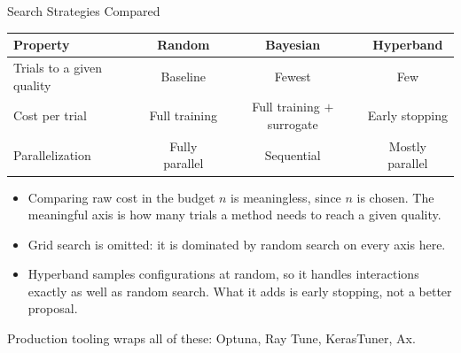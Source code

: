 \documentclass[aspectratio=169,11pt]{beamer}
\newcommand{\emphc}[1]{\textcolor{harvardcrimson}{#1}}
\begin{document}
\begin{frame}{Search Strategies Compared}
\begin{center}
\renewcommand{\arraystretch}{1.3}
\begin{tabular}{@{}lccc@{}}
\toprule
\textbf{Property} & \textbf{Random} & \textbf{Bayesian} & \textbf{Hyperband} \\
\midrule
Trials to a given quality & Baseline & \emphc{Fewest} & Few \\
Cost per trial & Full training & Full training $+$ surrogate & \emphc{Early stopping} \\
Parallelization & Fully parallel & Sequential & Mostly parallel \\
\bottomrule
\end{tabular}
\end{center}

\vspace{0.4cm}
\begin{itemize}\itemsep3pt
    \item Comparing raw cost in the budget $n$ is meaningless, since $n$ is chosen. The meaningful axis is how many trials a method needs to reach a given quality.
    \item Grid search is omitted: it is dominated by random search on every axis here.
    \item Hyperband samples configurations at random, so it handles interactions exactly as well as random search. What it adds is early stopping, not a better proposal.
\end{itemize}

\vspace{0.25cm}
{\footnotesize Production tooling wraps all of these: Optuna, Ray Tune, KerasTuner, Ax.}
\end{frame}
\end{document}
